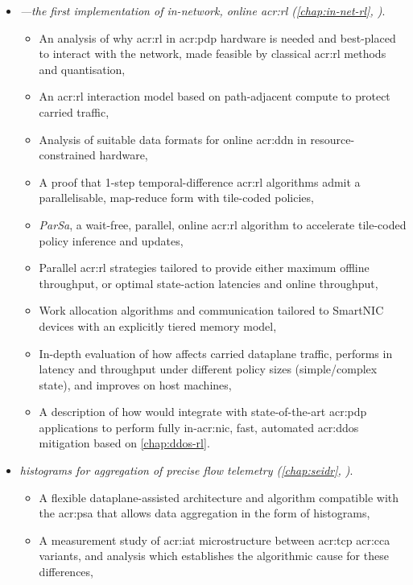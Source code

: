 \begin{itemize}
\begin{itemize}
	\end{itemize}
	\item \emph{\approachshort---the first implementation of in-network, online \gls{acr:rl} (\cref{chap:in-net-rl}, )}.
	\begin{itemize}
		\item An analysis of why \gls{acr:rl} in \gls{acr:pdp} hardware is needed and best-placed to interact with the network, made feasible by classical \gls{acr:rl} methods and quantisation,
		\item An \gls{acr:rl} interaction model based on path-adjacent compute to protect carried traffic,
		\item Analysis of suitable data formats for online \gls{acr:ddn} in resource-constrained hardware,
		\item A proof that 1-step temporal-difference \gls{acr:rl} algorithms admit a parallelisable, map-reduce form with tile-coded policies,
		\item \emph{ParSa}, a wait-free, parallel, online \gls{acr:rl} algorithm to accelerate tile-coded policy inference and updates,
		\item Parallel \gls{acr:rl} strategies tailored to provide either maximum offline throughput, or optimal state-action latencies and online throughput,
		\item Work allocation algorithms and communication tailored to SmartNIC devices with an explicitly tiered memory model,
		\item In-depth evaluation of how \approachshort{} affects carried dataplane traffic, performs in latency and throughput under different policy sizes (simple/complex state), and improves on host machines,
		\item A description of how \approachshort{} would integrate with state-of-the-art \gls{acr:pdp} applications to perform fully in-\gls{acr:nic}, fast, automated \gls{acr:ddos} mitigation based on \cref{chap:ddos-rl}.
	\end{itemize}
	\item \emph{\seidr{} histograms for aggregation of precise flow telemetry (\cref{chap:seidr}, )}.
	\begin{itemize}
		\item A flexible dataplane-assisted architecture and algorithm compatible with the \gls{acr:psa} that allows data aggregation in the form of histograms,
		\item A measurement study of \gls{acr:iat} microstructure between \gls{acr:tcp} \gls{acr:cca} variants, and analysis which establishes the algorithmic cause for these differences,

\end{itemize}
\end{itemize}

